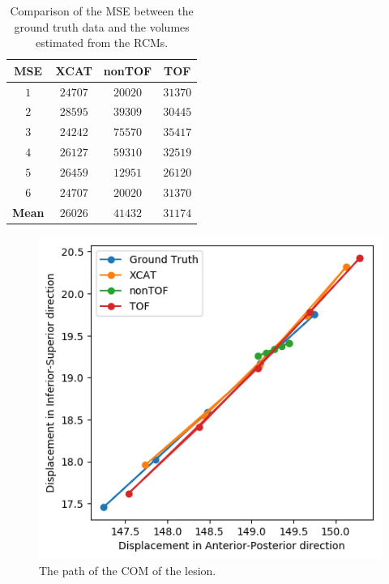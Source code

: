 \documentclass[portrait,color=UCLburgundy,margin=2cm]{uclposter}
\begin{document}
\begin{multicols}{2}

\begin{table}[H]
    \centering
    \caption{Comparison of the MSE between the ground truth data and the volumes estimated from the RCMs.}
    
    \vspace{1.0cm}
    
    \scalebox{1.7}
    {
        \begin{tabular}{||c|ccc||}
            \hline
                \textbf{MSE}    & \textbf{XCAT} & \textbf{nonTOF}   & \textbf{TOF}  \\
            \hline
                \textbf{$1$}    & $24707$       & $20020$           & $31370$       \\
                \textbf{$2$}    & $28595$       & $39309$           & $30445$       \\
                \textbf{$3$}    & $24242$       & $75570$           & $35417$       \\
                \textbf{$4$}    & $26127$       & $59310$           & $32519$       \\
                \textbf{$5$}    & $26459$       & $12951$           & $26120$       \\
                \textbf{$6$}    & $24707$       & $20020$           & $31370$       \\
            \hline
                \textbf{Mean}   & $26026$       & $41432$           & $31174$       \\
            \hline
        \end{tabular}
    }
    \label{tab:mse}
\end{table}

\begin{figure}[H]
    \centering
    \includegraphics[width=0.7\linewidth]{com_graph.png}
    \caption{The path of the COM of the lesion.}
    \label{fig:com_graph}
\end{figure}

\end{multicols}
\end{document}
